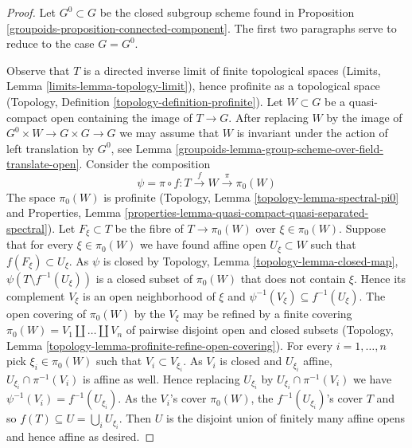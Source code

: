 \begin{proof}

Let $G^0 \subset G$ be the closed subgroup scheme found in
Proposition \ref{groupoids-proposition-connected-component}. The first two paragraphs
serve to reduce to the case $G = G^0$.

\medskip\noindent
Observe that $T$ is a directed inverse limit of finite topological spaces
(Limits, Lemma \ref{limits-lemma-topology-limit}), hence profinite as a
topological space (Topology, Definition \ref{topology-definition-profinite}).
Let $W \subset G$ be a quasi-compact open containing the image of $T \to G$.
After replacing $W$ by the image of $G^0 \times W \to G \times G \to G$ we may
assume that $W$ is invariant under the action of left translation by $G^0$, see
Lemma \ref{groupoids-lemma-group-scheme-over-field-translate-open}.
Consider the composition
$$
\psi = \pi \circ f : T \xrightarrow{f} W \xrightarrow{\pi} \pi_0(W)
$$
The space $\pi_0(W)$ is profinite
(Topology, Lemma \ref{topology-lemma-spectral-pi0} and
Properties, Lemma
\ref{properties-lemma-quasi-compact-quasi-separated-spectral}).
Let $F_\xi \subset T$ be the fibre of $T \to \pi_0(W)$ over $\xi \in \pi_0(W)$.
Suppose that for every $\xi \in \pi_0(W)$ we have found affine open
$U_\xi \subset W$ such that $f(F_\xi) \subset U_\xi$. As $\psi$ is closed by
Topology, Lemma \ref{topology-lemma-closed-map},
$\psi(T \setminus f^{-1}(U_\xi))$ is a closed subset of $\pi_0(W)$
that does not contain $\xi$. Hence its complement $V_\xi$ is an
open neighborhood of $\xi$ and $\psi^{-1}(V_\xi) \subseteq f^{-1}(U_\xi)$.
The open covering of $\pi_0(W)$ by the $V_\xi$ may be refined by
a finite covering $\pi_0(W) = V_1 \amalg \ldots \amalg V_n$
of pairwise disjoint open and closed subsets (Topology,
Lemma \ref{topology-lemma-profinite-refine-open-covering}).
For every $i = 1, \ldots, n$ pick $\xi_i \in \pi_0(W)$
such that $V_i \subset V_{\xi_i}$. As $V_i$ is closed and
$U_{\xi_i}$ affine, $U_{\xi_i} \cap \pi^{-1}(V_i)$ is affine as well.
Hence replacing $U_{\xi_i}$ by $U_{\xi_i} \cap \pi^{-1}(V_i)$ we
have $\psi^{-1}(V_i) = f^{-1}(U_{\xi_i})$. As the $V_i$'s cover
$\pi_0(W)$, the $f^{-1}(U_{\xi_i})$'s cover $T$ and so
$f(T) \subseteq U = \bigcup_i U_{\xi_i}$. Then $U$ is the disjoint
union of finitely many affine opens and hence affine as desired.


\end{proof}

